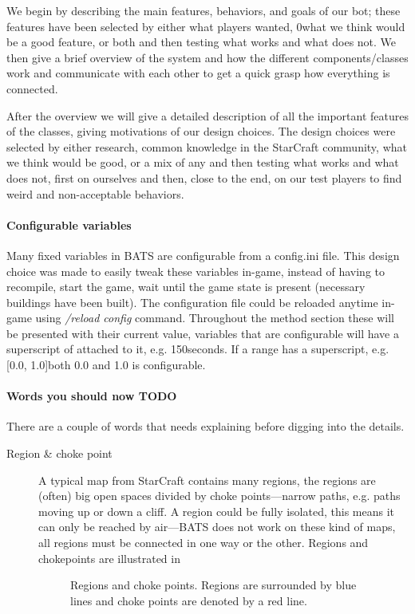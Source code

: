 
We begin by describing the main features, behaviors, and goals of our bot; these features have been selected by either what players wanted, 0what we think would be a good feature, or both and then testing what works and what does not. We then give a brief overview of the system and how the different components/classes work and communicate with each other to get a quick grasp how everything is connected.

After the overview we will give a detailed description of all the important features of the classes, giving motivations of our design choices. The design choices were selected by either research, common knowledge in the StarCraft community, what we think would be good, or a mix of any and then testing what works and what does not, first on ourselves and then, close to the end, on our test players to find weird and non-acceptable behaviors.

\paragraph{Configurable variables}
Many fixed variables in BATS are configurable from a config.ini file. This design choice was made to easily tweak these variables in-game, instead of having to recompile, start the game, wait until the game state is present (necessary buildings have been built). The configuration file could be reloaded anytime in-game using \emph{/reload config} command. Throughout the method section these will be presented with their current value, variables that are configurable will have a superscript of \conf attached to it, e.g. 150\conf seconds. If a range has a superscript, e.g. [0.0, 1.0]\conf both 0.0 and 1.0 is configurable.

\paragraph{Words you should now TODO}
There are a couple of words that needs explaining before digging into the details.

\begin{description}
	\item[Region \& choke point] A typical map from StarCraft contains many regions, the regions are (often) big open spaces divided by choke points—narrow paths, e.g. paths moving up or down a cliff. A region could be fully isolated, this means it can only be reached by air—BATS does not work on these kind of maps, all regions must be connected in one way or the other. Regions and chokepoints are illustrated in 
	\begin{figure}
		\caption[Regions and choke points]{Regions and choke points. Regions are surrounded by blue lines and choke points are denoted by a red line.}
		\label{fig:region_and_choke_points}
	\end{figure}
\end{description}